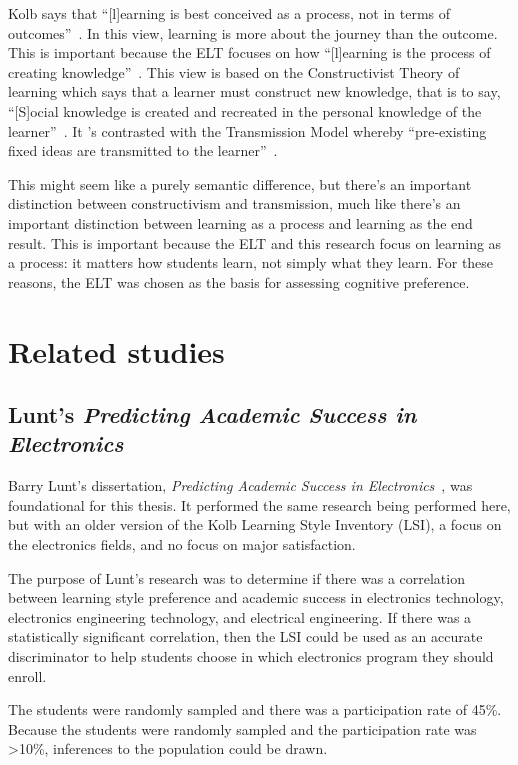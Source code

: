 Kolb says that ``[l]earning is best conceived as a process, not in terms of outcomes''~\citep{kolb2005a}. In this view, learning is more about the journey than the outcome. This is important because the ELT focuses on how ``[l]earning is the process of creating knowledge''~\citep{kolb2005a}. This view is based on the Constructivist Theory of learning which says that a learner must construct new knowledge, that is to say, ``[S]ocial knowledge is created and recreated in the personal knowledge of the learner''~\citep{kolb2005b}. It 's contrasted with the Transmission Model whereby ``pre-existing fixed ideas are transmitted to the learner''~\citep{kolb2005a}.

This might seem like a purely semantic difference, but there's an important distinction between constructivism and transmission, much like there's an important distinction between learning as a process and learning as the end result. This is important because the ELT and this research focus on learning as a process: it matters how students learn, not simply what they learn. For these reasons, the ELT was chosen as the basis for assessing cognitive preference.

\section{Related studies}
\subsection{Lunt's \textit{Predicting Academic Success in Electronics}}
Barry Lunt's dissertation, \textit{Predicting Academic Success in Electronics}~\citep{lunt1996}, was foundational for this thesis. It performed the same research being performed here, but with an older version of the Kolb Learning Style Inventory (LSI), a focus on the electronics fields, and no focus on major satisfaction.

The purpose of Lunt's research was to determine if there was a correlation between learning style preference and academic success in electronics technology, electronics engineering technology, and electrical engineering. If there was a statistically significant correlation, then the LSI could be used as an accurate discriminator to help students choose in which electronics program they should enroll.

The students were randomly sampled and there was a participation rate of 45\%. Because the students were randomly sampled and the participation rate was >10\%, inferences to the population could be drawn.

